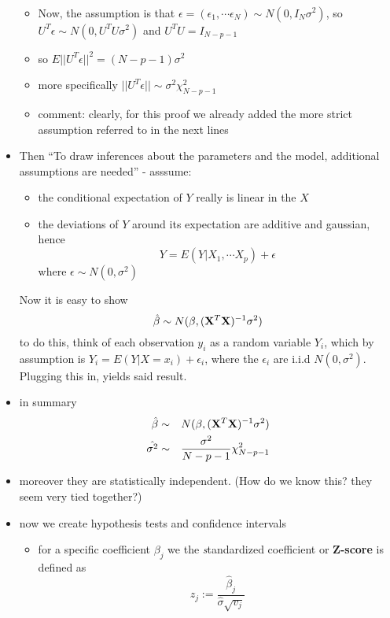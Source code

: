 \begin{itemize}
\begin{itemize}
\begin{eqnarray}
	 \end{eqnarray}
       \item Now, the assumption is that $\epsilon = (\epsilon_1, \cdots \epsilon_N) \sim N(0, I_N\sigma^2)$, so $U^T\epsilon \sim N(0, U^TU\sigma^2)$ and $U^TU = I_{N-p-1}$
       \item so $E||U^T\epsilon||^2 = (N - p - 1) \sigma^2 $
       \item more specifically $||U^T\epsilon|| \sim \sigma^2\chi^2_{N-p-1}$
       \item comment: clearly, for this proof we already added the more strict assumption referred to in the next lines
     \end{itemize}
   \item Then ``To draw inferences about the parameters and the model, additional assumptions are needed'' - asssume:
     \begin{itemize}
       \item the conditional expectation of $Y$ really is linear in the $X$
       \item the deviations of $Y$ around its expectation are additive and gaussian, hence
	 \begin{equation}
	   Y = E(Y|X_1, \cdots X_p) + \epsilon 
	 \end{equation}
	 where $\epsilon \sim N(0, \sigma^2)$
     \end{itemize}
     Now it is easy to show 
     $$ \hat{\beta} \sim N(\beta, ({\bf X}^T {\bf X})^{-1} \sigma^2) $$
     \subitem to do this, think of each observation $y_i$ as a random variable $Y_i$, which by assumption is $Y_i = E(Y|X=x_i) + \epsilon_i$, where the $\epsilon_i$ are i.i.d $N(0,\sigma^2)$. Plugging this in, yields said result. 
   \item in summary
     \begin{eqnarray}
	\hat{\beta} &\sim& N(\beta, ({\bf X}^T {\bf X})^{-1} \sigma^2)  \\
	\hat{\sigma^2} &\sim& \frac{\sigma^2}{N-p-1} \chi^2_{N-p-1}
     \end{eqnarray}
   \item moreover they are statistically independent. {\red (How do we know this? they seem very tied together?)}
   \item now we create hypothesis tests and confidence intervals
     \begin{itemize}
       \item for a specific coefficient $\beta_j$ we the {\emph standardized coefficient} or {\bf Z-score} is defined as
	 $$ z_j := \frac{\hat{\beta}_j}{\hat{\sigma} \sqrt{v_j}} $$

\end{itemize}
\end{itemize}
